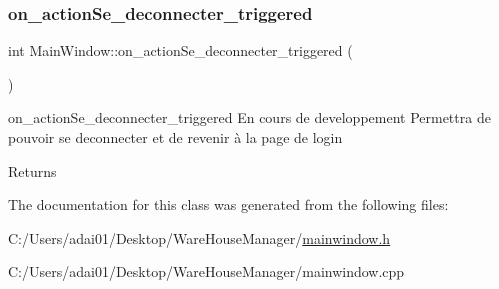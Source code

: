 \subsubsection{\texorpdfstring{on\+\_\+action\+Se\+\_\+deconnecter\+\_\+triggered}{on\_actionSe\_deconnecter\_triggered}}
{\footnotesize\ttfamily int Main\+Window\+::on\+\_\+action\+Se\+\_\+deconnecter\+\_\+triggered (\begin{DoxyParamCaption}{ }\end{DoxyParamCaption})\hspace{0.3cm}{\ttfamily [slot]}}



on\+\_\+action\+Se\+\_\+deconnecter\+\_\+triggered En cours de developpement Permettra de pouvoir se deconnecter et de revenir à la page de login 

\begin{DoxyReturn}{Returns}

\end{DoxyReturn}


The documentation for this class was generated from the following files\+:\begin{DoxyCompactItemize}
\item 
C\+:/\+Users/adai01/\+Desktop/\+Ware\+House\+Manager/\mbox{\hyperlink{mainwindow_8h}{mainwindow.\+h}}\item 
C\+:/\+Users/adai01/\+Desktop/\+Ware\+House\+Manager/mainwindow.\+cpp\end{DoxyCompactItemize}
